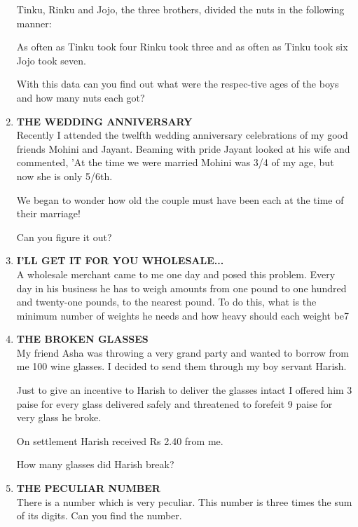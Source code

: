 \documentclass[12pt]{article}
\begin{document}
\begin{enumerate}
Tinku,  Rinku  and  Jojo,  the  three  brothers,  divided the nuts  in the following  manner: 

As often  as Tinku  took  four  Rinku  took  three  and as often  as Tinku  took  six Jojo  took  seven. 

With  this data  can you find  out what  were  the respec-tive ages  of the boys  and how  many  nuts  each  got? 

%
\item \textbf{THE  WEDDING  ANNIVERSARY} \\
Recently  I attended  the  twelfth  wedding  anniversary celebrations  of my  good  friends  Mohini  and  Jayant. Beaming  with  pride  Jayant  looked  at his wife  and commented,  'At  the  time  we were  married  Mohini  was  3/4 of my age,  but now  she is only  5/6th. 

We began  to wonder  how  old  the couple  must  have been  each  at the time  of their  marriage! 

Can you figure  it out? 


%
\item \textbf{I'LL  GET  IT FOR  YOU  WHOLESALE...} \\
A wholesale  merchant  came  to me  one  day  and  posed this problem.  Every  day  in his business  he has to weigh amounts  from  one  pound  to one  hundred  and twenty-one pounds,  to the nearest  pound.  To  do this,  what  is the minimum  number  of weights  he needs  and how  heavy should  each  weight  be7 


\item \textbf{THE  BROKEN  GLASSES} \\
My friend  Asha  was  throwing  a very  grand  party and wanted  to borrow  from  me 100  wine  glasses.  I decided  to send  them  through  my boy servant  Harish. 

Just to give  an incentive  to Harish  to deliver  the glasses intact  I offered  him  3 paise  for every  glass  delivered safely  and threatened  to forefeit  9 paise  
for very  glass  he broke. 

On settlement  Harish  received  Rs 2.40  from  me. 

How  many  glasses  did Harish  break? 

%
\item \textbf{THE  PECULIAR  NUMBER} \\
There  is a number  which  is very  peculiar.  This  number is three  times  the sum  of its digits.  Can  you  find  the number. 


\end{enumerate}
\end{document}
